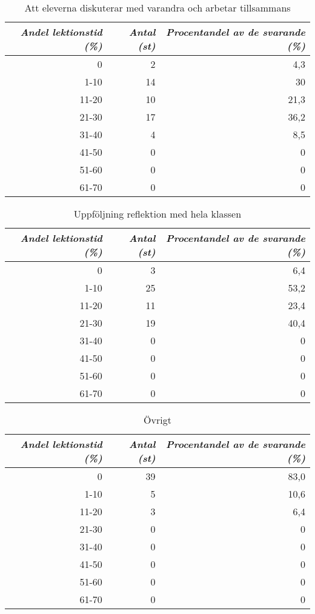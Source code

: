 \begin{table}
\caption{Att eleverna diskuterar med varandra och arbetar tillsammans}
\centering
\begin{tabular}{||r|r|r||} \hline\hline
\emph{Andel lektionstid (\%)} & \emph{Antal (st)} & \emph{Procentandel av de svarande (\%)} \\ \hline
\hline
0 & 2 & 4,3 \\ \hline
1-10 & 14 & 30 \\ \hline
11-20 & 10 & 21,3 \\ \hline
21-30 & 17 & 36,2 \\ \hline
31-40 & 4 & 8,5 \\ \hline
41-50 & 0 & 0 \\ \hline
51-60 & 0 & 0 \\ \hline
61-70 & 0 & 0 \\ \hline\hline
\end{tabular}
\label{table:Diskussion}
\end{table}

\begin{table}
\caption{Uppföljning reflektion med hela klassen}
\centering
\begin{tabular}{||r|r|r||} \hline\hline
\emph{Andel lektionstid (\%)} & \emph{Antal (st)} & \emph{Procentandel av de svarande (\%)} \\ \hline
\hline
0 & 3 & 6,4 \\ \hline
1-10 & 25 & 53,2 \\ \hline
11-20 & 11 & 23,4 \\ \hline
21-30 & 19 & 40,4 \\ \hline
31-40 & 0 & 0 \\ \hline
41-50 & 0 & 0 \\ \hline
51-60 & 0 & 0 \\ \hline
61-70 & 0 & 0 \\ \hline\hline
\end{tabular}
\label{table:Uppfoljning}
\end{table}

\begin{table}
\caption{Övrigt}
\centering
\begin{tabular}{||r|r|r||} \hline\hline
\emph{Andel lektionstid (\%)} & \emph{Antal (st)} & \emph{Procentandel av de svarande (\%)} \\ \hline
\hline
0 & 39 & 83,0 \\ \hline
1-10 & 5 & 10,6 \\ \hline
11-20 & 3 & 6,4 \\ \hline
21-30 & 0 & 0 \\ \hline
31-40 & 0 & 0 \\ \hline
41-50 & 0 & 0 \\ \hline
51-60 & 0 & 0 \\ \hline
61-70 & 0 & 0 \\ \hline\hline
\end{tabular}
\label{table:Ovrigt}
\end{table}

